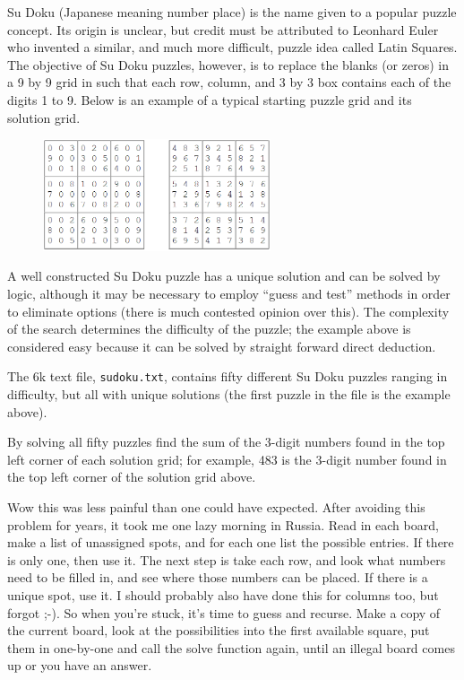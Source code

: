 \footnotesize
Su Doku (Japanese meaning number place) is the name given to a popular puzzle concept. Its origin is unclear, but credit must be attributed to Leonhard Euler who invented a similar, and much more difficult, puzzle idea called Latin Squares. The objective of Su Doku puzzles, however, is to replace the blanks (or zeros) in a 9 by 9 grid in such that each row, column, and 3 by 3 box contains each of the digits 1 to 9. Below is an example of a typical starting puzzle grid and its solution grid.
\vspace{-0.5cm}
\begin{center}
\begin{figure}[h]
\centering
\includegraphics[width = 0.60\textwidth]{./images/p_096.png}
\end{figure}
\end{center}
\vspace{-1.3cm}
A well constructed Su Doku puzzle has a unique solution and can be solved by logic, although it may be necessary to employ ``guess and test'' methods in order to eliminate options (there is much contested opinion over this). The complexity of the search determines the difficulty of the puzzle; the example above is considered easy because it can be solved by straight forward direct deduction.

The 6k text file, \verb"sudoku.txt", contains fifty different Su Doku puzzles ranging in difficulty, but all with unique solutions (the first puzzle in the file is the example above).

By solving all fifty puzzles find the sum of the 3-digit numbers found in the top left corner of each solution grid; for example, 483 is the 3-digit number found in the top left corner of the solution grid above.

\vspace{-0.5cm}
Wow this was less painful than one could have expected.  After avoiding this problem for years, it took me one lazy morning in Russia.  Read in each board, make a list of unassigned spots, and for each one list the possible entries.  If there is only one, then use it.  The next step is take each row, and look what numbers need to be filled in, and see where those numbers can be placed.  If there is a unique spot, use it.  I should probably also have done this for columns too, but forgot ;-).  So when you're stuck, it's time to guess and recurse.  Make a copy of the current board, look at the possibilities into the first available square, put them in one-by-one and call the solve function again, until an illegal board comes up or you have an answer.

